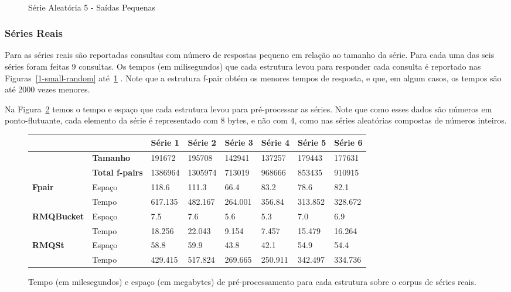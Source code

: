 \documentclass[12pt]{article}
\begin{document}
\begin{figure}
\begin{center}
\\
\caption{Série Aleatória 5 - Saídas Pequenas}
\label{5-small-random}
\end{center}
\end{figure}




\subsubsection{Séries Reais}

Para as séries reais são reportadas consultas com número de respostas pequeno
em relação ao tamanho da série. Para cada uma das seis séries foram feitas
9 consultas. Os tempos (em milisegundos) que cada estrutura levou para responder
cada consulta é reportado nas Figuras~\ref{1-small-random} até~\ref{5-small-random}
. Note que a estrutura f-pair obtém os menores tempos de resposta,
e que, em algum casos, os tempos são até 2000 vezes menores.

Na Figura~\ref{pre-real} temos o tempo e espaço que cada estrutura levou para pré-processar
as séries. Note que como esses dados são números em ponto-flutuante, cada elemento
da série é representado com $8$ bytes, e não com $4$, como nas séries aleatórias compostas
de números inteiros.

\begin{figure}
\begin{tabular}{|l|l|l|l|l|l|l|l|}
\hline
      &    & Série 1 & Série 2 & Série 3 & Série 4 & Série 5 & Série 6\\
\hline
			& \textbf{Tamanho}  & 191672 & 195708   & 142941  & 137257  & 179443  & 177631 \\
\hline
			& \textbf{Total f-pairs}  & 1386964 & 1305974   & 713019  & 968666  & 853435 & 910915 \\
\hline
\multirow{2}{*}{\textbf{Fpair}} & Espaço & 118.6  & 111.3  & 66.4  & 83.2  & 78.6  & 82.1 \\
                       					& Tempo & 617.135 & 482.167 & 264.001 & 356.84 & 313.852 & 328.672\\
\hline
\multirow{2}{*}{\textbf{RMQBucket}} & Espaço & 7.5  & 7.6  & 5.6  & 5.3  & 7.0 & 6.9 \\
													 					& Tempo & 18.256 & 22.043 & 9.154 & 7.457 & 15.479 & 16.264\\
\hline
\multirow{2}{*}{\textbf{RMQSt}} & Espaço &  58.8 & 59.9 & 43.8 & 42.1 & 54.9 & 54.4\\
											 					& Tempo &  429.415 & 517.824 & 269.665 & 250.911 & 342.497 & 334.736\\
\hline
\end{tabular}
\label{pre-real}
\caption{Tempo (em milesegundos) e espaço (em megabytes) de pré-processamento para cada estrutura sobre
o corpus de séries reais.}
\end{figure}
\end{document}
